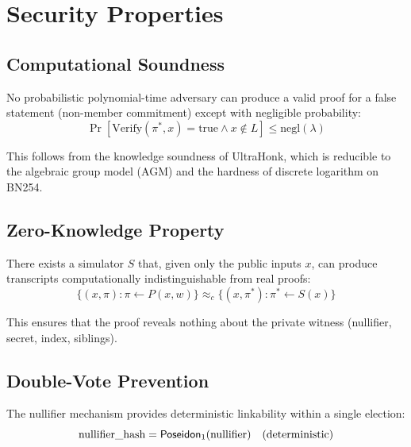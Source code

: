 \section{Security Properties}

\subsection{Computational Soundness}

\begin{theorem}[Soundness]
No probabilistic polynomial-time adversary can produce a valid proof for a false statement (non-member commitment) except with negligible probability:
\begin{equation}
\Pr[\text{Verify}(\pi^*, x) = \text{true} \wedge x \notin L] \leq \text{negl}(\lambda)
\end{equation}
\end{theorem}

This follows from the knowledge soundness of UltraHonk, which is reducible to the algebraic group model (AGM) and the hardness of discrete logarithm on BN254.

\subsection{Zero-Knowledge Property}

\begin{theorem}
There exists a simulator $S$ that, given only the public inputs $x$, can produce transcripts computationally indistinguishable from real proofs:
\begin{equation}
\{(x, \pi) : \pi \leftarrow P(x, w)\} \approx_c \{(x, \pi^*) : \pi^* \leftarrow S(x)\}
\end{equation}
\end{theorem}

This ensures that the proof reveals nothing about the private witness (nullifier, secret, index, siblings).

\subsection{Double-Vote Prevention}

The nullifier mechanism provides deterministic linkability within a single election:
\begin{equation}
\text{nullifier\_hash} = \mathsf{Poseidon}_1(\text{nullifier}) \quad \text{(deterministic)}
\end{equation}

